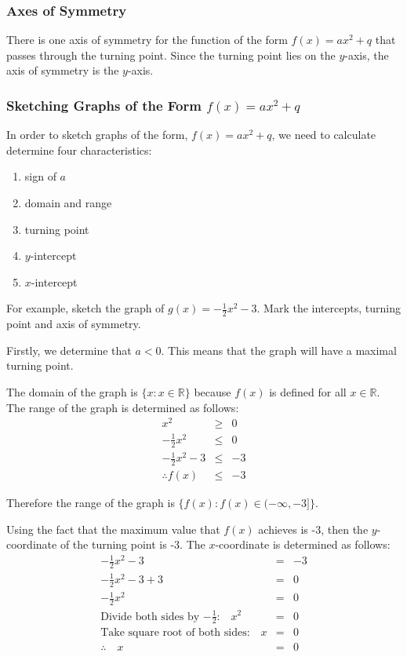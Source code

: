 \documentclass[10pt,a4paper,titlepage,twoside,openright]{report}
\begin{document}
\subsubsection{Axes of Symmetry}
There is one axis of symmetry for the function of the form $f(x)=ax^2+q$ that passes through the turning point. Since the turning point lies on the $y$-axis, the axis of symmetry is the $y$-axis.

\subsubsection{Sketching Graphs of the Form $f(x)=ax^2+q$}
In order to sketch graphs of the form, $f(x)=ax^2+q$, we need to calculate determine four characteristics:
\begin{enumerate}
\item{sign of $a$}
\item{domain and range}
\item{turning point}
\item{$y$-intercept}
\item{$x$-intercept}
\end{enumerate}

For example, sketch the graph of $g(x)=-\frac{1}{2} x^2-3$. Mark the intercepts, turning point and axis of symmetry.

Firstly, we determine that $a<0$. This means that the graph will have a maximal turning point.

The domain of the graph is $\{x:x\in\mathbb{R}\}$ because $f(x)$ is defined for all $x\in \mathbb{R}$. The range of the graph is determined as follows:
\begin{eqnarray*}
 x^2 &\ge& 0\\
-\frac{1}{2}x^2 &\le& 0\\
-\frac{1}{2}x^2-3 &\le& -3\\
\therefore f(x) &\le& -3
\end{eqnarray*}

Therefore the range of the graph is $\{f(x):f(x)\in(-\infty,-3]\}$.

Using the fact that the maximum value that $f(x)$ achieves is -3, then the $y$-coordinate of the turning point is -3. The $x$-coordinate is determined as follows:
\begin{eqnarray*}
-\frac{1}{2}x^2-3 &=& -3\\
-\frac{1}{2}x^2-3+3 &=& 0\\
-\frac{1}{2}x^2 &=& 0\\
\mbox{Divide both sides by $-\frac{1}{2}$:} \quad x^2 &=& 0\\
\mbox{Take square root of both sides:} \quad x &=& 0\\
\therefore \quad x&=&0
\end{eqnarray*}
\end{document}
